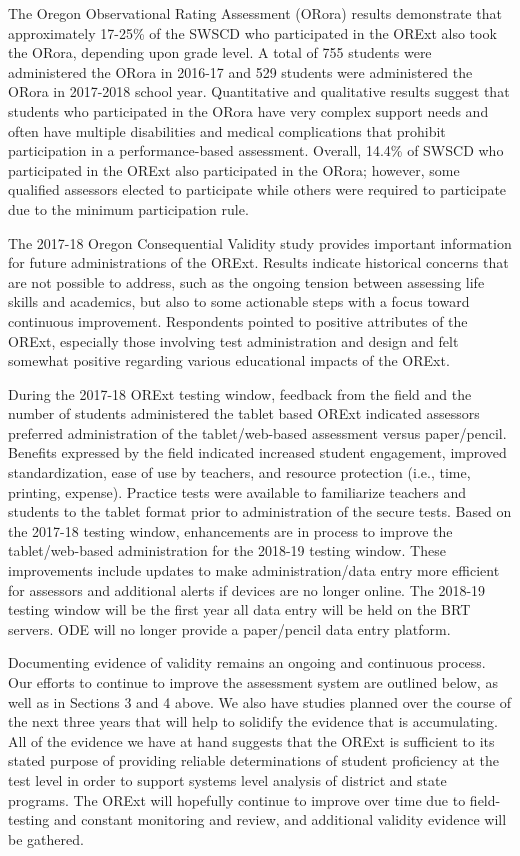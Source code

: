 \documentclass[]{article}
\begin{document}
The Oregon Observational Rating Assessment (ORora) results demonstrate
that approximately 17-25\% of the SWSCD who participated in the ORExt
also took the ORora, depending upon grade level. A total of 755 students
were administered the ORora in 2016-17 and 529 students were
administered the ORora in 2017-2018 school year. Quantitative and
qualitative results suggest that students who participated in the ORora
have very complex support needs and often have multiple disabilities and
medical complications that prohibit participation in a performance-based
assessment. Overall, 14.4\% of SWSCD who participated in the ORExt also
participated in the ORora; however, some qualified assessors elected to
participate while others were required to participate due to the minimum
participation rule.

The 2017-18 Oregon Consequential Validity study provides important
information for future administrations of the ORExt. Results indicate
historical concerns that are not possible to address, such as the
ongoing tension between assessing life skills and academics, but also to
some actionable steps with a focus toward continuous improvement.
Respondents pointed to positive attributes of the ORExt, especially
those involving test administration and design and felt somewhat
positive regarding various educational impacts of the ORExt.

During the 2017-18 ORExt testing window, feedback from the field and the
number of students administered the tablet based ORExt indicated
assessors preferred administration of the tablet/web-based assessment
versus paper/pencil. Benefits expressed by the field indicated increased
student engagement, improved standardization, ease of use by teachers,
and resource protection (i.e., time, printing, expense). Practice tests
were available to familiarize teachers and students to the tablet format
prior to administration of the secure tests. Based on the 2017-18
testing window, enhancements are in process to improve the
tablet/web-based administration for the 2018-19 testing window. These
improvements include updates to make administration/data entry more
efficient for assessors and additional alerts if devices are no longer
online. The 2018-19 testing window will be the first year all data entry
will be held on the BRT servers. ODE will no longer provide a
paper/pencil data entry platform.

Documenting evidence of validity remains an ongoing and continuous
process. Our efforts to continue to improve the assessment system are
outlined below, as well as in Sections 3 and 4 above. We also have
studies planned over the course of the next three years that will help
to solidify the evidence that is accumulating. All of the evidence we
have at hand suggests that the ORExt is sufficient to its stated purpose
of providing reliable determinations of student proficiency at the test
level in order to support systems level analysis of district and state
programs. The ORExt will hopefully continue to improve over time due to
field-testing and constant monitoring and review, and additional
validity evidence will be gathered.
\end{document}
